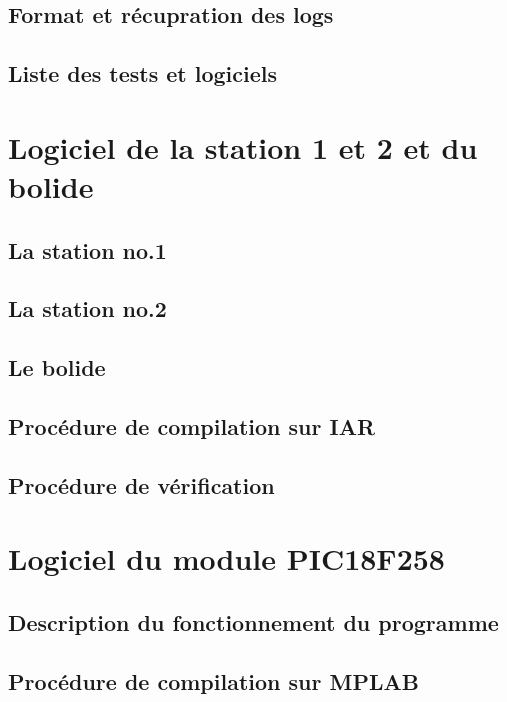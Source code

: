 \documentclass[10pt,a4paper,final]{article}
\begin{document}
\begin{spacing}{1.5}
\subsection{Format et récupration des logs}

\subsection{Liste des tests et logiciels}






\pagebreak
\section{Logiciel de la station 1 et 2 et du bolide}

\subsection{La station no.1}

\subsection{La station no.2}

\subsection{Le bolide}

\subsection{Procédure de compilation sur IAR}

\subsection{Procédure de vérification}




\section{Logiciel du module PIC18F258}
\subsection{Description du fonctionnement du programme}

\subsection{Procédure de compilation sur MPLAB}


\end{spacing}
\end{document}
